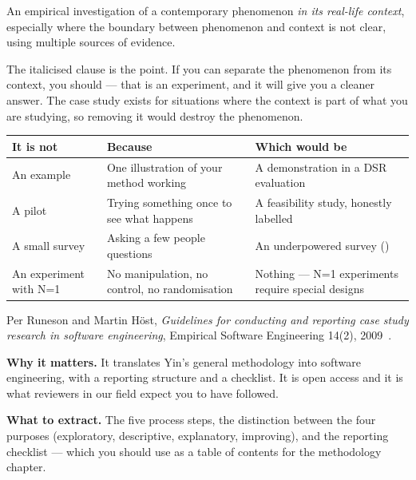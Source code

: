 \begin{definitionbox}
An empirical investigation of a contemporary phenomenon \emph{in its real-life
context}, especially where the boundary between phenomenon and context is not
clear, using multiple sources of evidence.

\medskip
The italicised clause is the point. If you can separate the phenomenon from its
context, you should --- that is an experiment, and it will give you a cleaner
answer. The case study exists for situations where the context is part of what
you are studying, so removing it would destroy the phenomenon.
\end{definitionbox}

\begin{center}
\small
\begin{tabular}{@{}L{3.2cm}L{5.4cm}L{5.5cm}@{}}
\toprule
\textbf{It is not} & \textbf{Because} & \textbf{Which would be} \\
\midrule
An example
  & One illustration of your method working
  & A demonstration in a DSR evaluation \\
A pilot
  & Trying something once to see what happens
  & A feasibility study, honestly labelled \\
A small survey
  & Asking a few people questions
  & An underpowered survey () \\
An experiment with N=1
  & No manipulation, no control, no randomisation
  & Nothing --- N=1 experiments require special designs \\
\bottomrule
\end{tabular}
\end{center}

\begin{paperbox}
Per Runeson and Martin H{\"o}st, \emph{Guidelines for conducting and reporting
case study research in software engineering}, Empirical Software Engineering
14(2), 2009~\cite{runeson2009guidelines}.\oa{}

\medskip
\textbf{Why it matters.} It translates Yin's general methodology into software
engineering, with a reporting structure and a checklist. It is open access and
it is what reviewers in our field expect you to have followed.

\medskip
\textbf{What to extract.} The five process steps, the distinction between the
four purposes (exploratory, descriptive, explanatory, improving), and the
reporting checklist --- which you should use as a table of contents for the
methodology chapter.
\end{paperbox}

